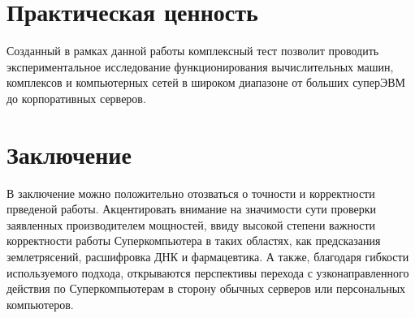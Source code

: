\documentclass{article}
\begin{document}
\section{Практическая ценность}
Созданный в рамках данной работы комплексный тест позволит проводить экспериментальное исследование функционирования вычислительных машин, комплексов и компьютерных сетей в широком диапазоне от больших суперЭВМ до корпоративных серверов.
\section{Заключение}
В заключение можно положительно отозваться о точности и корректности прведеной работы. Акцентировать внимание на значимости сути проверки заявленных производителем мощностей, ввиду высокой степени важности корректности работы Суперкомпьютера в таких областях, как предсказания землетрясений, расшифровка ДНК и фармацевтика. А также, благодаря гибкости используемого подхода, открываются перспективы перехода с узконаправленного действия по Суперкомпьютерам в сторону обычных серверов или персональных компьютеров.
\end{document}

